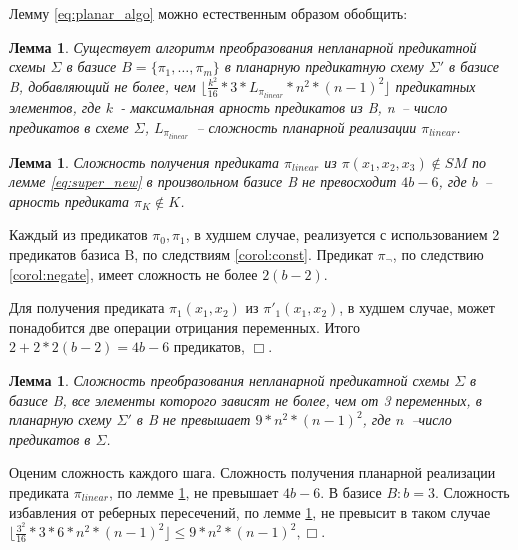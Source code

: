 \documentclass[12pt]{article}
\newtheorem{lemma}[theorem]{Лемма}
\newenvironment{proof}[1][Доказательство]{\begin{trivlist}
\item[\hskip \labelsep {\bfseries #1}]}{\end{trivlist}}
\begin{document}
Лемму \ref{eq:planar_algo} можно естественным образом обобщить:
\begin{lemma}
\label{general_planar_algo_complexity}
Существует алгоритм преобразования непланарной предикатной схемы $\Sigma$ в базисе $B = \{\pi_1, \dots, \pi_m \}$
в планарную предикатную схему $\Sigma'$ в базисе B, добавляющий не более, чем $\lfloor \frac{k^2}{16} * 3 * L_{\pi_{linear}} * n^2*(n-1)^2 \rfloor$ 
предикатных элементов, где $k$~- максимальная арность предикатов из B, n~-- число предикатов в схеме $\Sigma$, 
$L_{\pi_{linear}}$~-- сложность планарной реализации $\pi_{linear}$.
\end{lemma}

\begin{lemma}
\label{complexity}
Сложность получения предиката $\pi_{linear}$ из $\pi(x_1, x_2, x_3) \notin SM$ по лемме \ref{eq:super_new}
в произвольном базисе B не 
превосходит $4b - 6$, где $b$~-- арность предиката $\pi_K \notin K$.
\end{lemma}
\begin{proof}
Каждый из предикатов $\pi_0, \pi_1$, в худшем случае, реализуется с использованием 2 предикатов базиса B,
по следствиям \ref{corol:const}. Предикат $\pi_{\neg}$, по следствию \ref{corol:negate}, имеет сложность не более $2(b-2)$.

Для получения предиката  $\pi_1(x_1, x_2)$ из $\pi'_1(x_1, x_2)$, в худшем случае, может понадобится 
две операции отрицания переменных.
Итого $2 + 2 * 2(b-2) = 4b - 6$ предикатов, $\Box$.
\end{proof}

\begin{lemma}
Сложность преобразования непланарной предикатной схемы $\Sigma$ в базисе B, 
все элементы которого зависят не более, чем от 3 переменных, 
в планарную схему $\Sigma'$ в B не превышает $9 * n^2 * (n-1)^2$, где $n$~--число предикатов в $\Sigma$.
\end{lemma}
\begin{proof}
Оценим сложность каждого шага. Сложность получения планарной реализации предиката $\pi_{linear}$, по лемме \ref{complexity},
не превышает $4b - 6$. В базисе $B: b=3$. Сложность избавления от реберных пересечений, по лемме \ref{general_planar_algo_complexity}, не 
превысит в таком случае $\lfloor \frac{3^2}{16} * 3 * 6 * n^2 * (n-1)^2 \rfloor \le 9 * n^2 * (n-1)^2, \Box$.
\end{proof}
\end{document}
